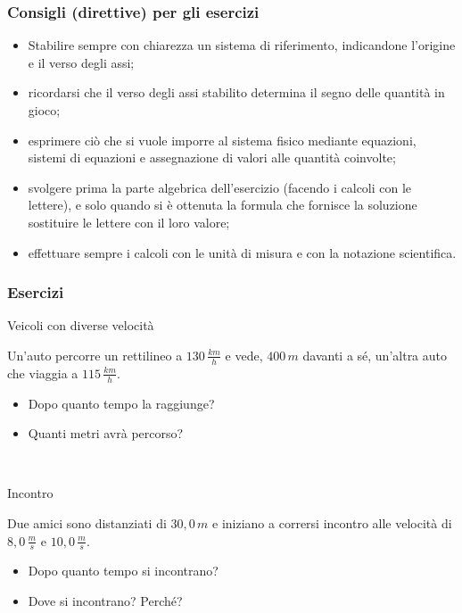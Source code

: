 \documentclass[]{beamer}
\theoremstyle{plain}
\begin{document}
\begin{frame}
  \frametitle{Consigli (direttive) per gli esercizi}
  
  \begin{itemize}
    \item Stabilire sempre con chiarezza un \alert{sistema di riferimento}, indicandone l'origine e il verso degli assi;\pause
    \item ricordarsi che il verso degli assi stabilito determina il \alert{segno} delle quantità in gioco;\pause
    \item esprimere ciò che si vuole imporre al sistema fisico mediante equazioni, sistemi di equazioni e assegnazione di valori alle quantità coinvolte;\pause
    \item svolgere \alert{prima} la parte algebrica dell'esercizio (facendo i calcoli con le lettere), e solo quando si è ottenuta la formula che fornisce la soluzione sostituire le lettere con il loro valore;\pause
    \item effettuare sempre i calcoli con le \alert{unità di misura} e con la \alert{notazione scientifica}.
  \end{itemize}
\end{frame}


\begin{frame}
\frametitle{Esercizi}
\begin{exampleblock}{Veicoli con diverse velocità}
\begin{small}
Un'auto percorre un rettilineo a $ 130 \, \frac{km}{h} $ e vede, $ 400 \, m $ davanti a sé, un'altra auto che viaggia a $ 115 \, \frac{km}{h} $.
\begin{itemize}
  \item Dopo quanto tempo la raggiunge?
  \item Quanti metri avrà percorso?
\end{itemize}
\end{small}
\end{exampleblock}

~

\begin{exampleblock}{Incontro}
\begin{small}
Due amici sono distanziati di $ 30,0 \, m $ e iniziano a corrersi incontro alle velocità di $ 8,0 \, \frac{m}{s} $ e $ 10,0 \, \frac{m}{s} $.
\begin{itemize}
  \item Dopo quanto tempo si incontrano?
  \item Dove si incontrano? Perché?
\end{itemize}
\end{small}
\end{exampleblock}
\end{frame}
\end{document}
